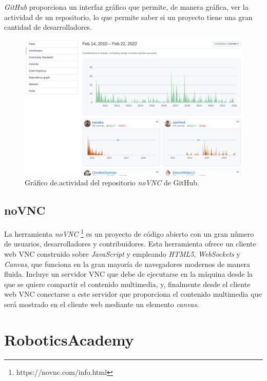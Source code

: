 \documentclass[a4paper, 12pt]{book}
\begin{document}
\emph{GitHub} proporciona un interfaz gráfico que permite, de manera gráfica, ver la actividad de un repositorio, lo que permite saber si un proyecto tiene una gran cantidad de desarrolladores.

\begin{figure}[H]
	\centering
    \includegraphics[width=15cm]{img/github_contributors.png}
    \caption{Gráfico de.actividad del repositorio \emph{noVNC} de GitHub.}
    \label{figura:simulador_gazebo}
\end{figure}

\subsection{noVNC}
\label{subsection:novnc}

La herramienta \emph{noVNC} \footnote{https://novnc.com/info.html} es un proyecto de código abierto con un gran número de usuarios, desarrolladores y contribuidores. Esta herramienta ofrece un cliente web VNC construido sobre \emph{JavaScript} y empleando \emph{HTML5}, \emph{WebSockets} y \emph{Canvas}, que funciona en la gran mayoría de navegadores modernos de manera fluida. Incluye un servidor VNC que debe de ejecutarse en la máquina desde la que se quiere compartir el contenido multimedia, y, finalmente desde el cliente web VNC conectarse a este servidor que proporciona el contenido multimedia que será mostrado en el cliente web mediante un elemento \emph{canvas}.

\section{RoboticsAcademy}
\label{section:roboticsacademy}
\end{document}
